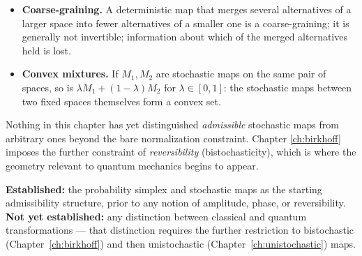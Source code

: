 \begin{itemize}
\item[] \textbf{Coarse-graining.} A deterministic map that merges several
alternatives of a larger space into fewer alternatives of a smaller one is a
coarse-graining; it is generally not invertible; information about which of
the merged alternatives held is lost.
\item[] \textbf{Convex mixtures.} If $M_1, M_2$ are stochastic maps on the same
pair of spaces, so is $\lambda M_1 + (1-\lambda) M_2$ for $\lambda \in [0,1]$:
the stochastic maps between two fixed spaces themselves form a convex set.
\end{itemize}

\begin{remark}
Nothing in this chapter has yet distinguished \emph{admissible} stochastic maps
from arbitrary ones beyond the bare normalization constraint. Chapter
\ref{ch:birkhoff} imposes the further constraint of \emph{reversibility}
(bistochasticity), which is where the geometry relevant to quantum mechanics
begins to appear.
\end{remark}

\begin{ledgerentry}
\textbf{Established:} the probability simplex and stochastic maps as the
starting admissibility structure, prior to any notion of amplitude, phase, or
reversibility.\\
\textbf{Not yet established:} any distinction between classical and quantum
transformations — that distinction requires the further restriction to
bistochastic (Chapter~\ref{ch:birkhoff}) and then unistochastic
(Chapter~\ref{ch:unistochastic}) maps.
\end{ledgerentry}
